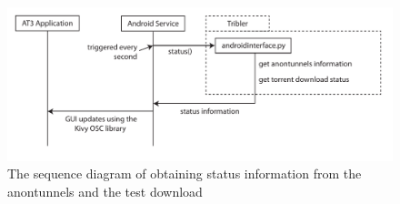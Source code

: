 \begin{figure}[t!]
	\centering
	\includegraphics[width=\textwidth]{graphics/sequence-info.pdf}
	\caption{The sequence diagram of obtaining status information from the anontunnels and the test download}
	\label{fig:sequenceinfo}
\end{figure}



